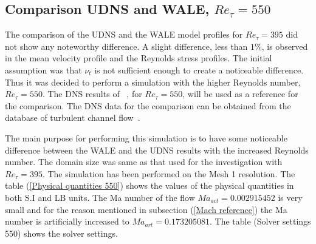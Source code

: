 \subsection{Comparison UDNS and WALE, $Re_\tau = 550$}
The comparison of the UDNS and the WALE model profiles for $Re_\tau = 395$ did not show any noteworthy difference. A slight difference, less than $1\%$, is observed in the mean velocity profile and the Reynolds stress profiles. The initial assumption was that $\nu_t$ is not sufficient enough to create a noticeable difference. Thus it was decided to perform a simulation with the higher Reynolds number, $Re_\tau = 550$. The DNS results of~\cite{lee:moser:15} , for $Re_\tau = 550$, will be used as a reference for the comparison. The DNS data for the comparison can be obtained from the database of turbulent channel flow~\cite{channeldata:99}.

The main purpose for performing this simulation is to have some noticeable difference between the WALE and the UDNS results with the increased Reynolds number. The domain size was same as that used for the investigation with $Re_\tau = 395$. The simulation has been performed on the Mesh 1 resolution. The table (\ref{Physical quantities 550}) shows the values of the physical quantities in both S.I and LB units. The Ma number of the flow $Ma_{act} = 0.002915452$ is very small and for the reason mentioned in subsection (\ref{Mach reference}) the Ma number is artificially increased to $Ma_{art} = 0.173205081$. The table (Solver settings 550) shows the solver settings.\\

